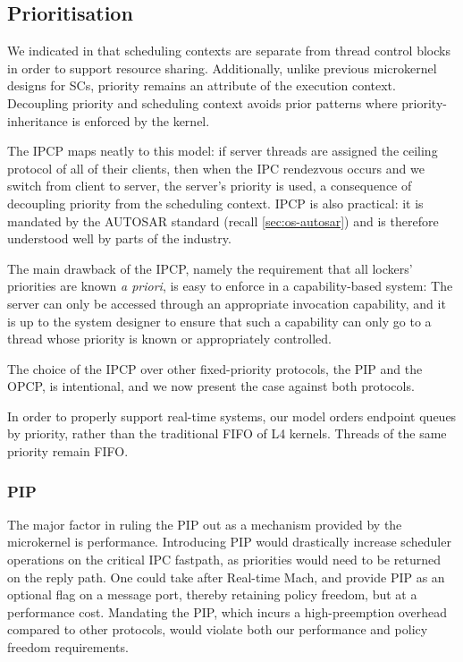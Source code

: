 \subsection{Prioritisation}

We indicated in  that scheduling contexts are separate from thread control blocks in
order to support resource sharing. Additionally, unlike previous microkernel designs for \glspl{SC}, priority
remains an attribute of the execution context. Decoupling priority and scheduling context avoids
prior patterns where priority-inheritance is enforced by the kernel. 

The \Gls{IPCP} maps neatly to this model: if server threads are assigned the ceiling protocol of all of
their clients, then when the \gls{IPC} rendezvous occurs and we switch from client to server, the
server's priority is used, a consequence of decoupling priority from the scheduling context.
\gls{IPCP} is also practical: it is mandated by the AUTOSAR standard
(recall \cref{sec:os-autosar}) and is therefore understood well by parts of the industry.

The main drawback of the \gls{IPCP}, namely the requirement that all
lockers' priorities are known \emph{a priori}, is easy to enforce in a
capability-based system: The server can only be accessed through an
appropriate invocation capability, and it is up to the system designer
to ensure that such a capability can only go to a thread whose
priority is known or appropriately controlled.

The choice of the \gls{IPCP} over other fixed-priority protocols, the \gls{PIP} and the \gls{OPCP},
is intentional, and we now present the case against both protocols.

In order to properly support real-time systems, our model orders endpoint queues by priority, rather
than the traditional \gls{FIFO} of L4 kernels. Threads of the same priority remain FIFO. 

\subsubsection{\gls{PIP}}

The major factor in ruling the \gls{PIP} out as a mechanism provided by the microkernel is
performance. Introducing \gls{PIP} would drastically increase scheduler operations on the critical
\gls{IPC} fastpath, as priorities would need to be returned on the reply path. One could take after
Real-time Mach, and provide \gls{PIP} as an optional flag on a message port, thereby retaining
policy freedom, but at a performance cost. Mandating the \gls{PIP}, which incurs a high-preemption
overhead compared to other protocols, would violate both our performance and policy freedom
requirements. 

